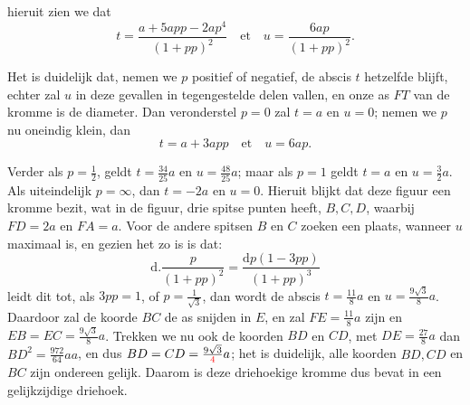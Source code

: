 \documentclass[10pt,a4paper]{article}
\def\D{\mathrm{d}}
\begin{document}
\begin{paracol}{2}
\begin{enumerate}[topsep=1px]
		hieruit zien we dat
		\[
			t = \frac{a+5app-2ap^4}{(1+pp)^2}\quad \text{et} \quad u = \frac{6ap}{(1+pp)^2}.
		\]
		\par Het is duidelijk dat, nemen we $p$ positief of negatief, de abscis $t$ hetzelfde blijft, echter zal $u$ in deze gevallen in tegengestelde delen vallen, en onze as $FT$ van de kromme is de diameter. Dan veronderstel $p=0$ zal $t=a$ en $u=0$; nemen we $p$ nu oneindig klein, dan
		\[
			t = a + 3app\quad \text{et} \quad u= 6ap.
		\]
		\par Verder als $p=\frac{1}{2}$, geldt $t = \frac{34}{25}a$ en $u= \frac{48}{25}a$; maar als $p=1$ geldt $t=a$ en $u=\frac{3}{2}a$. Als uiteindelijk $p=\infty$, dan $t=-2a$ en $u=0$. Hieruit blijkt dat deze figuur een kromme bezit, wat in de figuur, drie spitse punten heeft, $B,C,D$, waarbij $FD=2a$ en $FA=a$. Voor de andere spitsen $B$ en $C$ zoeken een plaats, wanneer $u$ maximaal is, en gezien het zo is is dat:
		\[
			\D.\frac{p}{(1+pp)^2} = \frac{\D p(1-3pp)}{(1+pp)^3}
		\]
		leidt dit tot, als $3pp=1$, of $p=\frac{1}{\sqrt{3}}$, dan wordt de abscis $t=\frac{11}{8}a$ en $u=\frac{9\sqrt{3}}{8}a$. Daardoor zal de koorde $BC$ de as snijden in $E$, en zal $FE=\frac{11}{8}a$ zijn en $EB=EC=\frac{9\sqrt{3}}{8}a$. Trekken we nu ook de koorden $BD$ en $CD$, met $DE=\frac{27}{8}a$ dan $BD^2 = \frac{972}{64}aa$, en dus $BD=CD = \frac{9\sqrt{3}}{\color{red}4}a$; het is duidelijk, alle koorden $BD, CD$ en $BC$ zijn ondereen gelijk. Daarom is deze driehoekige kromme dus bevat in een gelijkzijdige driehoek.

		\switchcolumn*
		

\end{enumerate}
\end{paracol}
\end{document}
